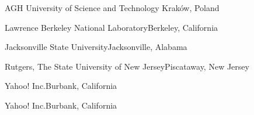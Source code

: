 \begin{multicols}{2}
 {AGH University of Science and Technology}{
Krak{\'o}w, Poland}


 {Lawrence Berkeley National
Laboratory}{Berkeley, California}

 {Jacksonville State University}{Jacksonville,
Alabama}

 {Rutgers, The State University of New
Jersey}{Piscataway, New Jersey}

 {Yahoo! Inc.}{Burbank, California}

 {Yahoo! Inc.}{Burbank, California}

\end{multicols}